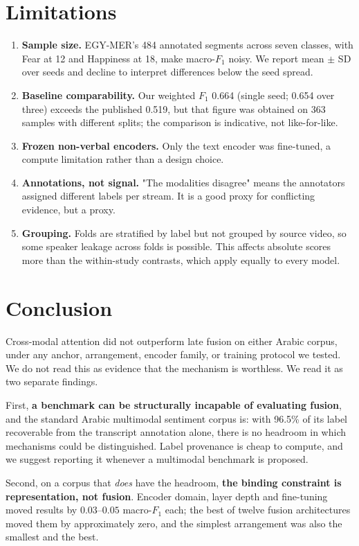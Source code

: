 \documentclass[12pt, a4paper]{article}
\begin{document}
\section{Limitations}
\label{sec:limits}

\begin{enumerate}
\item \textbf{Sample size.} EGY-MER's 484 annotated segments across seven
classes, with Fear at 12 and Happiness at 18, make macro-$F_1$ noisy. We report
mean $\pm$ SD over seeds and decline to interpret differences below the seed
spread.
\item \textbf{Baseline comparability.} Our weighted $F_1$ 0.664 (single seed;
0.654 over three) exceeds the
published 0.519, but that figure was obtained on 363 samples with different
splits; the comparison is indicative, not like-for-like.
\item \textbf{Frozen non-verbal encoders.} Only the text encoder was fine-tuned,
a compute limitation rather than a design choice.
\item \textbf{Annotations, not signal.} "The modalities disagree" means the
annotators assigned different labels per stream. It is a good proxy for
conflicting evidence, but a proxy.
\item \textbf{Grouping.} Folds are stratified by label but not grouped by source
video, so some speaker leakage across folds is possible. This affects absolute
scores more than the within-study contrasts, which apply equally to every model.
\end{enumerate}

\section{Conclusion}

Cross-modal attention did not outperform late fusion on either Arabic corpus,
under any anchor, arrangement, encoder family, or training protocol we tested.
We do not read this as evidence that the mechanism is worthless. We read it as
two separate findings.

First, \textbf{a benchmark can be structurally incapable of evaluating fusion},
and the standard Arabic multimodal sentiment corpus is: with 96.5\% of its label
recoverable from the transcript annotation alone, there is no headroom in which
mechanisms could be distinguished. Label provenance is cheap to compute, and we
suggest reporting it whenever a multimodal benchmark is proposed.

Second, on a corpus that \emph{does} have the headroom, \textbf{the binding
constraint is representation, not fusion}. Encoder domain, layer depth and
fine-tuning moved results by $0.03$--$0.05$ macro-$F_1$ each; the best of twelve
fusion architectures moved them by approximately zero, and the simplest
arrangement was also the smallest and the best.



\end{document}
